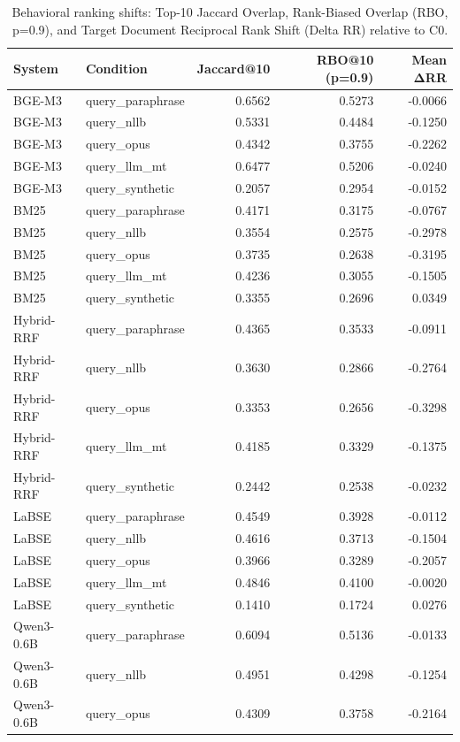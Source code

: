 \begin{table}
\caption{Behavioral ranking shifts: Top-10 Jaccard Overlap, Rank-Biased Overlap (RBO, p=0.9), and Target Document Reciprocal Rank Shift (Delta RR) relative to C0.}
\label{tab:behavioral_shifts}
\begin{tabular}{llrrr}
\toprule
System & Condition & Jaccard@10 & RBO@10 (p=0.9) & Mean ΔRR \\
\midrule
BGE-M3 & query_paraphrase & 0.6562 & 0.5273 & -0.0066 \\
BGE-M3 & query_nllb & 0.5331 & 0.4484 & -0.1250 \\
BGE-M3 & query_opus & 0.4342 & 0.3755 & -0.2262 \\
BGE-M3 & query_llm_mt & 0.6477 & 0.5206 & -0.0240 \\
BGE-M3 & query_synthetic & 0.2057 & 0.2954 & -0.0152 \\
BM25 & query_paraphrase & 0.4171 & 0.3175 & -0.0767 \\
BM25 & query_nllb & 0.3554 & 0.2575 & -0.2978 \\
BM25 & query_opus & 0.3735 & 0.2638 & -0.3195 \\
BM25 & query_llm_mt & 0.4236 & 0.3055 & -0.1505 \\
BM25 & query_synthetic & 0.3355 & 0.2696 & 0.0349 \\
Hybrid-RRF & query_paraphrase & 0.4365 & 0.3533 & -0.0911 \\
Hybrid-RRF & query_nllb & 0.3630 & 0.2866 & -0.2764 \\
Hybrid-RRF & query_opus & 0.3353 & 0.2656 & -0.3298 \\
Hybrid-RRF & query_llm_mt & 0.4185 & 0.3329 & -0.1375 \\
Hybrid-RRF & query_synthetic & 0.2442 & 0.2538 & -0.0232 \\
LaBSE & query_paraphrase & 0.4549 & 0.3928 & -0.0112 \\
LaBSE & query_nllb & 0.4616 & 0.3713 & -0.1504 \\
LaBSE & query_opus & 0.3966 & 0.3289 & -0.2057 \\
LaBSE & query_llm_mt & 0.4846 & 0.4100 & -0.0020 \\
LaBSE & query_synthetic & 0.1410 & 0.1724 & 0.0276 \\
Qwen3-0.6B & query_paraphrase & 0.6094 & 0.5136 & -0.0133 \\
Qwen3-0.6B & query_nllb & 0.4951 & 0.4298 & -0.1254 \\
Qwen3-0.6B & query_opus & 0.4309 & 0.3758 & -0.2164 \\

\end{tabular}
\end{table}
